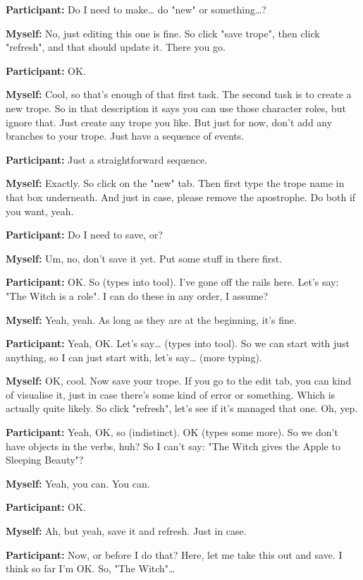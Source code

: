 \documentclass[11pt]{report}
\newcommand{\llabel}[1]{\hypertarget{llineno:#1}{\linelabel{#1}}}
\begin{document}
\begin{linenumbers}
\textbf{Participant:} Do I need to make\ldots{} do "new" or something\ldots{}?

\textbf{Myself:} No, just editing this one is fine. So click "save trope", then click "refresh", and that should update it. There you go.

\textbf{Participant:} OK.

\textbf{Myself:} Cool, so that's enough of that first task. The second task is to create a new trope. So in that description it says you can use those character roles, but ignore that. Just create any trope you like. But just for now, don't add any branches to your trope. Just have a sequence of events.

\textbf{Participant:} Just a straightforward sequence.

\textbf{Myself:} Exactly. So click on the "new" tab. Then first type the trope name in that box underneath. And just in case, please remove the apostrophe. Do both if you want, yeah.

\textbf{Participant:} Do I need to save, or?

\textbf{Myself:} Um, no, don't save it yet. Put some stuff in there first.

\textbf{Participant:} OK. So (types into tool). I've gone off the rails here. Let's say: "The Witch is a role". I can do these in any order, I assume?

\textbf{Myself:} Yeah, yeah. As long as they are at the beginning, it's fine.

\textbf{Participant:} Yeah, OK. Let's say\ldots{} (types into tool). So we can start with just anything, so I can just start with, let's say\ldots{} (more typing).

\textbf{Myself:} OK, cool. Now save your trope. If you go to the edit tab, you can kind of visualise it, just in case there's some kind of error or something. Which is actually quite likely. So click "refresh", let's see if it's managed that one. Oh, yep.

\textbf{Participant:} Yeah, OK, so (indistinct). OK (types some more). So we
don't have objects in the verbs, huh? So I can't say: "The Witch gives the Apple
to Sleeping Beauty"?\llabel{lne:feature3g}

\textbf{Myself:} Yeah, you can. You can.

\textbf{Participant:} OK.

\textbf{Myself:} Ah, but yeah, save it and refresh. Just in case.

\textbf{Participant:} Now, or before I do that? Here, let me take this out and save. I think so far I'm OK. So, "The Witch"\ldots{}


\end{linenumbers}
\end{document}
